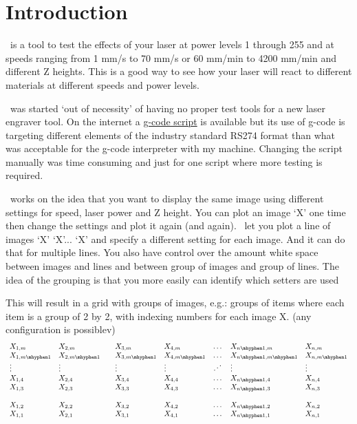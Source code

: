 \chapter{Introduction}\label{Introduction}

\GS\ is a tool to test the effects of your laser at power levels 1 through 255 and
at speeds ranging from 1 mm/s to 70 mm/s or 60 mm/min to 4200 mm/min and different
Z heights. This is a good way to see how your laser will react to different materials
at different speeds and power levels.

\GS\ was started `out of necessity' of having no proper test tools for a new laser
engraver tool. On the internet a \href{https://www.thingiverse.com/thing:3349071}{g-code script}
is available but its use of g-code is targeting different elements of the industry
standard RS274 format than what was acceptable for the g-code interpreter with my machine.
Changing the script manually was time consuming and just for one script where more testing
is required.

\GS\ works on the idea that you want to display the same image using different settings
for speed, laser power and Z height. You can plot an image `X' one time then change the settings
and plot it again (and again). \GS\ let you plot a line of images `X' `X'... `X' and specify
a different setting for each image. And it can do that for multiple lines. You also have
control over the amount white space between images and lines and between group of
images and group of lines. The idea of the grouping is that you more easily can identify which
setters are used

This will result in a grid with groups of images, e.g.: groups of items where
each item is a group of 2 by 2, with indexing numbers for each image X. (any configuration is possiblev)
\[
\begin{array}{llllllll}
    X_{1,m}   & X_{2,m}   &   & X_{3,m}   & X_{4,m}   & \dots  & X_{n\mhyphen 1,m}   & X_{n,m}\\
    X_{1,m\mhyphen 1} & X_{2,m\mhyphen 1} &   & X_{3,m\mhyphen 1} & X_{4,m\mhyphen 1} & \dots  & X_{n\mhyphen 1,m\mhyphen 1} & X_{n,m\mhyphen 1}\\
    \vdots    & \vdots    &   & \vdots    & \vdots    & \iddots & \vdots      & \vdots   \\
    X_{1,4}   & X_{2,4}   &   & X_{3,4}   & X_{4,4}   & \dots  & X_{n\mhyphen 1,4}   & X_{n,4}\\
    X_{1,3}   & X_{2,3}   &   & X_{3,3}   & X_{4,3}   & \dots  & X_{n\mhyphen 1,3}   & X_{n,3}\\
              &           &   &           &           &        &             &          \\
    X_{1,2}   & X_{2,2}   &   & X_{3,2}   & X_{4,2}   & \dots  & X_{n\mhyphen 1,2}   & X_{n,2}\\
    X_{1,1}   & X_{2,1}   &   & X_{3,1}   & X_{4,1}   & \dots  & X_{n\mhyphen 1,1}   & X_{n,1}\\
\end{array}
\]

